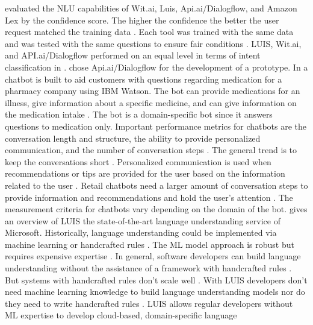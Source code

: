 \citet{gregori2017evaluation} evaluated the NLU capabilities of Wit.ai, Luis, Api.ai/Dialogflow, and Amazon Lex\cite{lexconversational}
by the confidence score. 
The higher the confidence the better the user request matched the training data \cite{gregori2017evaluation}.
Each tool was trained with the same data and was tested with the same questions to ensure fair conditions \cite{gregori2017evaluation}.
LUIS, Wit.ai, and API.ai/Dialogflow performed on an equal level in terms of intent classification in \citet{gregori2017evaluation}.
\citet{gregori2017evaluation} chose Api.ai/Dialogflow for the development of a prototype.
In \citet{pharmacybot} a chatbot is built to aid customers with questions regarding medication for a 
pharmacy company using IBM Watson.
The bot can provide medications for an illness, give information about a specific medicine, and can 
give information on the medication intake \cite{pharmacybot}.
The bot is a domain-specific bot since it answers questions to medication only.
Important performance metrics for chatbots are the conversation length and structure, the ability to 
provide personalized communication, and the number of conversation steps \cite{PRZEGALINSKA2019785}.
The general trend is to keep the conversations short \cite{PRZEGALINSKA2019785}.
Personalized communication is used when recommendations or tips are provided for the user based on the 
information related to the user \cite{PRZEGALINSKA2019785}.
Retail chatbots need a larger amount of conversation steps to provide information and recommendations 
and hold the user's attention \cite{PRZEGALINSKA2019785}.
The measurement criteria for chatbots vary depending on the domain of the bot.
\citet{luis2015williams} gives an overview of LUIS the state-of-the-art language understanding service of Microsoft.
Historically, language understanding could be implemented via machine learning or handcrafted rules \cite{luis2015williams}.
The ML model approach is robust but requires expensive expertise \cite{luis2015williams}. 
In general, software developers can build language understanding without the assistance of a framework
with handcrafted rules \cite{luis2015williams}. 
But systems with handcrafted rules don't scale well \cite{luis2015williams}.
With LUIS developers don't need machine learning knowledge to build language understanding models 
nor do they need to write handcrafted rules \cite{luis2015williams}.
LUIS allows regular developers without ML expertise to develop cloud-based, domain-specific language 
